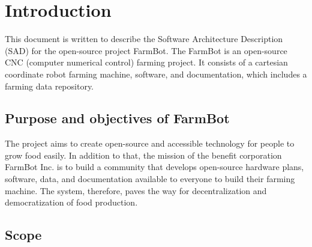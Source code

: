 
\chapter{Introduction} \label{introduction}

\quad This document is written to describe the Software Architecture Description (SAD) for the open-source project FarmBot. The FarmBot is an open-source CNC (computer numerical control) farming project. It consists of a cartesian coordinate robot farming machine, software, and documentation, which includes a farming data repository.


\section{Purpose and objectives of FarmBot}

The project aims to create open-source and accessible technology for people to grow
food easily. In addition to that, the mission of the benefit corporation FarmBot Inc.
is to build a community that develops open-source hardware plans, software, data,
and documentation available to everyone to build their farming machine.
The system, therefore, paves the way for decentralization and democratization of food
production.

\section{Scope}

